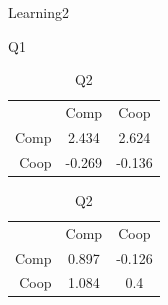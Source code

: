 \documentclass{beamer}
\begin{document}
\begin{frame}{Learning2}
    \begin{table}[!htb]
        \begin{minipage}{.5\linewidth}
          \caption{Q1}
          \centering
            \begin{tabular}{ r|c|c| }
                \multicolumn{1}{r}{}
                 &  \multicolumn{1}{c}{Comp}
                 & \multicolumn{1}{c}{Coop} \\
                \cline{2-3}
                Comp & 2.434 & 2.624 \\
                \cline{2-3}
                Coop & -0.269 & -0.136 \\
                \cline{2-3}
            \end{tabular}
        \end{minipage}%
        \begin{minipage}{.5\linewidth}
          \centering
            \caption{Q2}
            \begin{tabular}{ r|c|c| }
                \multicolumn{1}{r}{}
                 &  \multicolumn{1}{c}{Comp}
                 & \multicolumn{1}{c}{Coop} \\
                \cline{2-3}
                Comp & 0.897 & -0.126 \\
                \cline{2-3}
                Coop & 1.084 & 0.4 \\
                \cline{2-3}
            \end{tabular}
        \end{minipage}
    \end{table}


\end{frame}
\end{document}
